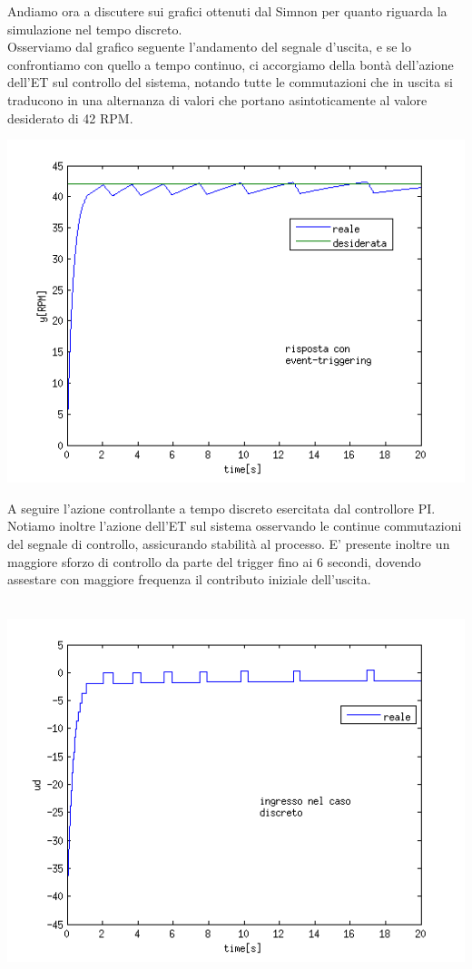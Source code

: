 \documentclass[a4paper,13pt]{article}
\begin{document}
	Andiamo ora a discutere sui grafici ottenuti dal Simnon per quanto riguarda la simulazione nel tempo discreto.\\
	Osserviamo dal grafico seguente l'andamento del segnale d'uscita, e se lo confrontiamo con quello a tempo continuo, ci 	accorgiamo della bontà dell'azione dell'ET sul controllo del sistema, notando tutte le commutazioni che in uscita si 		traducono in una alternanza di valori che portano asintoticamente al valore desiderato di 42 RPM.
	
\begin{center}
\includegraphics[scale=0.6]{graph/ydisc.png}
\end{center} 
	A seguire l'azione controllante a tempo discreto esercitata dal controllore PI. \\
	Notiamo inoltre l'azione dell'ET sul sistema osservando le continue commutazioni del segnale di controllo, assicurando 	stabilità al processo. E' presente inoltre un maggiore sforzo di controllo da parte del trigger fino ai 6 secondi, 			dovendo assestare con maggiore frequenza il contributo iniziale dell'uscita. \\ \\ 
\begin{center}
\includegraphics[scale=0.6]{graph/udisc.png} 
\end{center}
\end{document}

